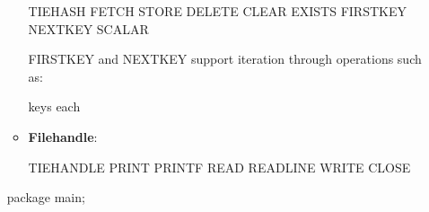 \documentclass{report}
\begin{document}
\begin{itemize}
\begin{itemize}
                    \bigbreak \noindent 
                    \begin{perlcode}
                        TIEHASH
                        FETCH
                        STORE
                        DELETE
                        CLEAR
                        EXISTS
                        FIRSTKEY
                        NEXTKEY
                        SCALAR
                    \end{perlcode}
                    \bigbreak \noindent 
                    FIRSTKEY and NEXTKEY support iteration through operations such as:
                    \bigbreak \noindent 
                    \begin{perlcode}
                        keys %
                        each %
                    \end{perlcode}
                \item \textbf{Filehandle}: 
                    \bigbreak \noindent 
                    \begin{perlcode}
                        TIEHANDLE
                        PRINT
                        PRINTF
                        READ
                        READLINE
                        WRITE
                        CLOSE
                    \end{perlcode}
            \end{itemize}
            \bigbreak \noindent 
            \bigbreak \noindent 
            \begin{perlcode}
                package main;


\end{perlcode}
\end{itemize}
\end{document}
